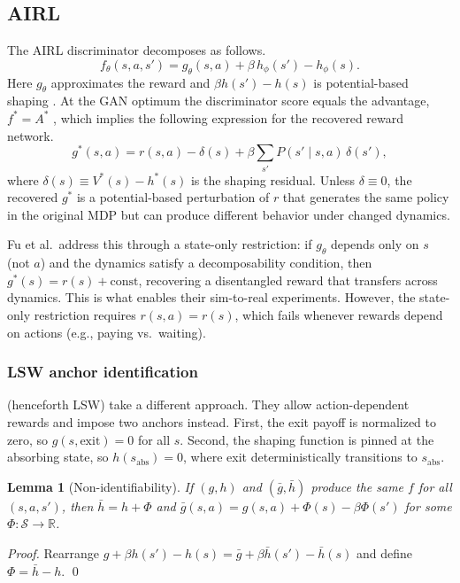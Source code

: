 \documentclass[11pt]{article}
\newtheorem{lemma}[theorem]{Lemma}
\begin{document}
\subsection{AIRL \citep{fu2018}}

The AIRL discriminator decomposes as follows.
\begin{equation}\label{eq:decomp}
f_\theta(s,a,s') = g_\theta(s,a) + \beta\, h_\phi(s') - h_\phi(s).
\end{equation}
Here $g_\theta$ approximates the reward and $\beta h(s') - h(s)$ is potential-based shaping \citep{ng1999}. At the GAN optimum the discriminator score equals the advantage, $f^* = A^*$ \citep[Appendix A.4]{fu2018}, which implies the following expression for the recovered reward network.
\begin{equation}\label{eq:gstar}
g^*(s,a) = r(s,a) - \delta(s) + \beta \sum_{s'} P(s' \mid s,a)\,\delta(s'),
\end{equation}
where $\delta(s) \equiv V^*(s) - h^*(s)$ is the shaping residual. Unless $\delta \equiv 0$, the recovered $g^*$ is a potential-based perturbation of $r$ that generates the same policy in the original MDP but can produce different behavior under changed dynamics.

Fu et al.\ address this through a state-only restriction: if $g_\theta$ depends only on $s$ (not $a$) and the dynamics satisfy a decomposability condition, then $g^*(s) = r(s) + \text{const}$, recovering a disentangled reward that transfers across dynamics. This is what enables their sim-to-real experiments. However, the state-only restriction requires $r(s,a) = r(s)$, which fails whenever rewards depend on actions (e.g., paying vs.\ waiting).

\subsubsection{LSW anchor identification \citep{lee2026}}

\citet{lee2026} (henceforth LSW) take a different approach. They allow action-dependent rewards and impose two anchors instead. First, the exit payoff is normalized to zero, so $g(s,\text{exit}) = 0$ for all $s$. Second, the shaping function is pinned at the absorbing state, so $h(s_{\mathrm{abs}}) = 0$, where exit deterministically transitions to $s_{\mathrm{abs}}$.

\begin{lemma}[Non-identifiability]\label{lem:nonid}
If $(g,h)$ and $(\bar{g},\bar{h})$ produce the same $f$ for all $(s,a,s')$, then $\bar{h} = h + \Phi$ and $\bar{g}(s,a) = g(s,a) + \Phi(s) - \beta\Phi(s')$ for some $\Phi : \mathcal{S} \to \mathbb{R}$.
\end{lemma}
\begin{proof}
Rearrange $g + \beta h(s') - h(s) = \bar{g} + \beta\bar{h}(s') - \bar{h}(s)$ and define $\Phi = \bar{h} - h$. \qed
\end{proof}
\end{document}
